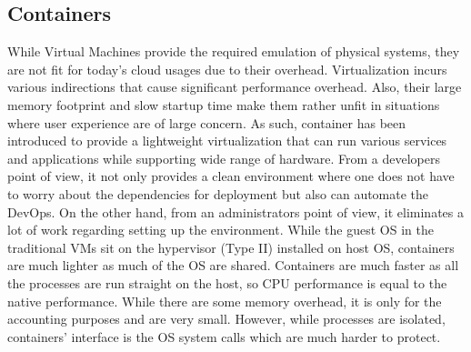 \subsection{Containers}
%
While Virtual Machines provide the required emulation of physical systems, they are not fit for today's cloud usages due to their overhead.
%
Virtualization incurs various indirections that cause significant performance overhead.
%
Also, their large memory footprint and slow startup time make them rather unfit in situations where user experience are of large concern.
%
As such, container has been introduced to provide a lightweight virtualization that can run various services and applications while supporting wide range of hardware.
%
From a developers point of view, it not only provides a clean environment where one does not have to worry about the dependencies for deployment but also can automate the DevOps.
%
On the other hand, from an administrators point of view, it eliminates a lot of work regarding setting up the environment.
%
While the guest OS in the traditional VMs sit on the hypervisor (Type II) installed on host OS, containers are much lighter as much of the OS are shared.
%
Containers are much faster as all the processes are run straight on the host, so CPU performance is equal to the native performance.
%
While there are some memory overhead, it is only for the accounting purposes and are very small.
%
However, while processes are isolated, containers' interface is the OS system calls which are much harder to protect.

%
%
